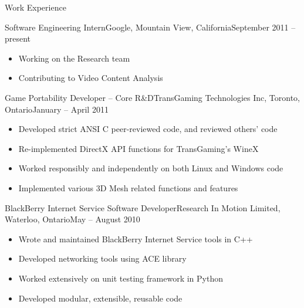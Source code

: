 \documentclass[11pt]{article}
\begin{document}
	\begin{section}{Work Experience} \\

        \begin{subsection}{Software Engineering Intern}{Google, Mountain View, California}{September 2011 -- present}

            \begin{itemize}
                \item Working on the Research team
                \item Contributing to Video Content Analysis
            \end{itemize}

        \end{subsection}

        \begin{subsection}{Game Portability Developer -- Core R\&D}{TransGaming Technologies Inc, Toronto, Ontario}{January -- April 2011}

            \begin{itemize}
                \item Developed strict ANSI C peer-reviewed code, and reviewed others' code
                \item Re-implemented DirectX API functions for TransGaming's WineX
                \item Worked responsibly and independently on both Linux and Windows code
                \item Implemented various 3D Mesh related functions and features
            \end{itemize}

        \end{subsection}

        \begin{subsection}{BlackBerry Internet Service Software Developer}{Research In Motion Limited, Waterloo, Ontario}{May -- August 2010}

            \begin{itemize}
                \item Wrote and maintained BlackBerry Internet Service tools in C++
                \item Developed networking tools using ACE library
                \item Worked extensively on unit testing framework in Python
                \item Developed modular, extensible, reusable code
            \end{itemize}


\end{subsection}
\end{section}
\end{document}
